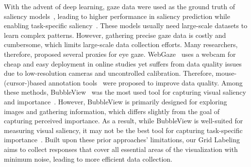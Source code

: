 With the advent of deep learning, gaze data were used as the ground truth of saliency models~\cite{fosco2020predicting, scannerDeeply, scanpath}, leading to higher performance in saliency prediction while enabling task-specific saliency~\cite{salchartQA}. 
These models usually need large-scale datasets to learn complex patterns. However, gathering precise gaze data is 
costly and cumbersome, which limits large-scale data collection efforts. 
Many researchers, therefore, proposed several proxies for eye gaze. WebGaze~\cite{webgaze} uses a webcam for cheap and easy deployment in online studies yet suffers from data quality issues due to low-resolution cameras and uncontrolled calibration.
Therefore, mouse-(cursor-)based annotation tools~\cite{jiang2015salicon,bubbleView,importAnnot} were proposed to improve data quality. Among these methods, BubbleView~\cite{bubbleView} was the most used tool for capturing visual saliency and importance~\cite{graphicDesignImportance, salchartQA}.
However, BubbleView is primarily designed for exploring images and gathering information, which differs slightly from the goal of capturing perceived importance. As a result, while BubbleView is well-suited for measuring visual saliency, it may not be the best tool for capturing %
task-specific importance~\cite{turkeyes}. Built upon these prior approaches' limitations, our Grid Labeling aims to collect responses that cover all essential areas of the visualization with minimum noise, leading to more efficient data collection.



